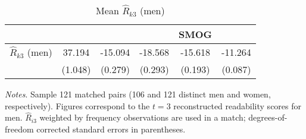 \begin{table}[H]
    \footnotesize
    \centering
    \begin{threeparttable}
        \caption{Mean \(\widehat R_{k3}\) (men)}
        \label{tableC17}
        \begin{tabular}{p{3cm}S@{}S@{}S@{}S@{}S@{}}
            \toprule
            &{}&{}&{}&{SMOG}&{}\\
            \midrule
            \(\widehat R_{k3}\) (men)     &      37.194&     -15.094&     -18.568&     -15.618&     -11.264\\
                                          &     (1.048)&     (0.279)&     (0.293)&     (0.193)&     (0.087)\\
            \bottomrule
        \end{tabular}
        \begin{tablenotes}
            \tiny
            \item \textit{Notes}. Sample 121 matched pairs (106 and 121 distinct men and women, respectively). Figures correspond to the \(t=3\) reconstructed readability scores for men. \(\widehat R_{i3}\) weighted by frequency observations are used in a match; degrees-of-freedom corrected standard errors in parentheses.
        \end{tablenotes}
    \end{threeparttable}
\end{table}